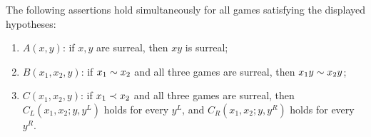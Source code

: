 \begin{theorem}
  \label{thm:abc-main}
  \leanok
  The following assertions hold simultaneously for all games satisfying the
  displayed hypotheses:
  \begin{enumerate}
    \item \(A(x,y)\): if \(x,y\) are surreal, then \(xy\) is surreal;
    \item \(B(x_1,x_2,y)\): if \(x_1\sim x_2\) and all three games are surreal, then
      \(x_1y\sim x_2y\);
    \item \(C(x_1,x_2,y)\): if \(x_1\prec x_2\) and all three games are surreal, then
      \(C_L(x_1,x_2;y,y^L)\) holds for every \(y^L\), and
      \(C_R(x_1,x_2;y,y^R)\) holds for every \(y^R\).
  \end{enumerate}
\end{theorem}
